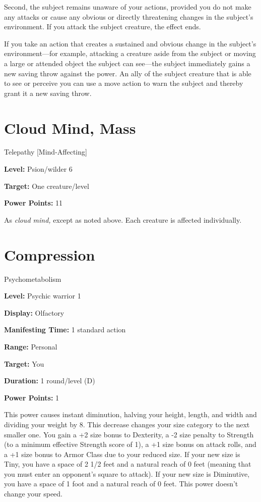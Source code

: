 \documentclass{article}
\begin{document}
Second, the subject remains unaware of your actions, provided you do not make any 
attacks or cause any obvious or directly threatening changes in the subject's environment. 
If you attack the subject creature, the effect ends.

If you take an action that creates a sustained and obvious change in the subject's 
environment---for example, attacking a creature aside from the subject or moving 
a large or attended object the subject can see---the subject immediately gains 
a new saving throw against the power. An ally of the subject creature that is able 
to see or perceive you can use a move action to warn the subject and thereby grant 
it a new saving throw.

\vspace{12pt}
\section*{Cloud Mind, Mass}

Telepathy [Mind-Affecting]

\textbf{Level:} Psion/wilder 6

\textbf{Target:} One creature/level

\textbf{Power Points:} 11

As \textit{cloud mind, }except as noted above. Each creature is affected individually.

\vspace{12pt}
\section*{Compression}

Psychometabolism

\textbf{Level:} Psychic warrior 1

\textbf{Display:} Olfactory

\textbf{Manifesting Time:} 1 standard action

\textbf{Range:} Personal

\textbf{Target:} You

\textbf{Duration:} 1 round/level (D)

\textbf{Power Points:} 1

This power causes instant diminution, halving your height, length, and width and 
dividing your weight by 8. This decrease changes your size category to the next 
smaller one. You gain a +2 size bonus to Dexterity, a -2 size penalty to Strength 
(to a minimum effective Strength score of 1), a +1 size bonus on attack rolls, 
and a +1 size bonus to Armor Class due to your reduced size. If your new size is 
Tiny, you have a space of 2 1/2 feet and a natural reach of 0 feet (meaning that 
you must enter an opponent's square to attack). If your new size is Diminutive, 
you have a space of 1 foot and a natural reach of 0 feet. This power doesn't change 
your speed. 
\end{document}
